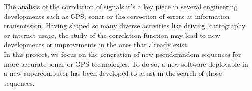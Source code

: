 The analisis of the correlation of signals it's a key piece in several
engineering developments such as GPS, sonar or the correction of errors at
information transmission. Having shaped so many diverse activities like
driving, cartography or internet usage, the study of the correlation function
may lead to new developments or improvements in the ones that already exist.\\

In this project, we focus on the generation of new pseudorandom sequences for
more accurate sonar or GPS technologies. To do so, a new software deployable in
a new supercomputer has been developed to assist in the search of those
sequences.

